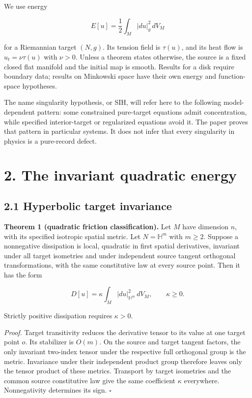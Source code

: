 \documentclass[
  11pt,
  a4paper,
]{article}
\begin{document}
We use energy

\[
E[u]=\frac12\int_M|du|_g^2\,dV_M
\]

for a Riemannian target \((N,g)\). Its tension field is \(\tau(u)\), and its heat flow is \(u_t=\nu\tau(u)\) with \(\nu>0\). Unless a theorem states otherwise, the source is a fixed closed flat manifold and the initial map is smooth. Results for a disk require boundary data; results on Minkowski space have their own energy and function-space hypotheses.

The name singularity hypothesis, or SIH, will refer here to the following model-dependent pattern: some constrained pure-target equations admit concentration, while specified interior-target or regularized equations avoid it. The paper proves that pattern in particular systems. It does not infer that every singularity in physics is a pure-record defect.

\section{2. The invariant quadratic energy}\label{the-invariant-quadratic-energy}

\subsection{2.1 Hyperbolic target invariance}\label{hyperbolic-target-invariance}

\textbf{Theorem 1 (quadratic friction classification).} Let \(M\) have dimension \(n\), with its specified isotropic spatial metric. Let \(N=\mathbb H^m\) with \(m\geq2\). Suppose a nonnegative dissipation is local, quadratic in first spatial derivatives, invariant under all target isometries and under independent source tangent orthogonal transformations, with the same constitutive law at every source point. Then it has the form

\[
D[u]=\kappa\int_M |du|_{\mathbb H^m}^2\,dV_M,
\qquad \kappa\geq0.
\]

Strictly positive dissipation requires \(\kappa>0\).

\emph{Proof.} Target transitivity reduces the derivative tensor to its value at one target point \(o\). Its stabilizer is \(O(m)\). On the source and target tangent factors, the only invariant two-index tensor under the respective full orthogonal group is the metric. Invariance under their independent product group therefore leaves only the tensor product of these metrics. Transport by target isometries and the common source constitutive law give the same coefficient \(\kappa\) everywhere. Nonnegativity determines its sign. \(\square\)
\end{document}
